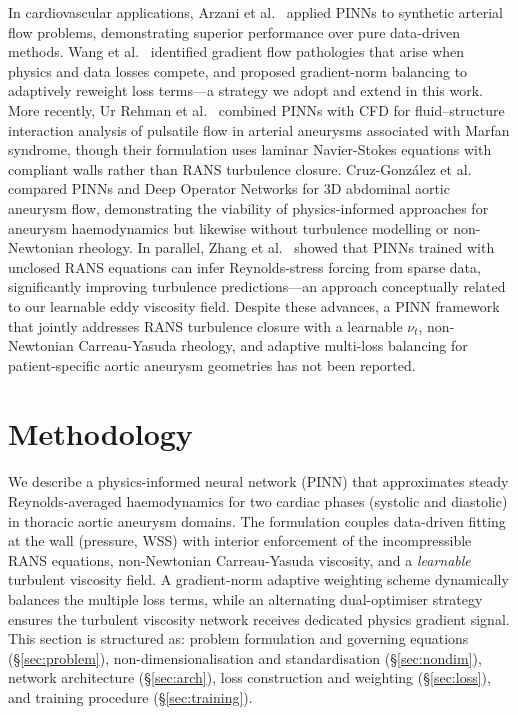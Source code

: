 \documentclass[11pt,a4paper]{article}
\begin{document}
In cardiovascular applications, Arzani et al.\ \cite{ref14} applied PINNs to synthetic arterial flow problems, demonstrating superior performance over pure data-driven methods. Wang et al.\ \cite{ref_wang2021} identified gradient flow pathologies that arise when physics and data losses compete, and proposed gradient-norm balancing to adaptively reweight loss terms---a strategy we adopt and extend in this work. More recently, Ur Rehman et al.\ \cite{ref_urrehman2025} combined PINNs with CFD for fluid--structure interaction analysis of pulsatile flow in arterial aneurysms associated with Marfan syndrome, though their formulation uses laminar Navier-Stokes equations with compliant walls rather than RANS turbulence closure. Cruz-Gonz{\'a}lez et al.\ \cite{ref_cruzgonzalez2025} compared PINNs and Deep Operator Networks for 3D abdominal aortic aneurysm flow, demonstrating the viability of physics-informed approaches for aneurysm haemodynamics but likewise without turbulence modelling or non-Newtonian rheology. In parallel, Zhang et al.\ \cite{ref_zhang2025} showed that PINNs trained with unclosed RANS equations can infer Reynolds-stress forcing from sparse data, significantly improving turbulence predictions---an approach conceptually related to our learnable eddy viscosity field. Despite these advances, a PINN framework that jointly addresses RANS turbulence closure with a learnable $\nu_t$, non-Newtonian Carreau-Yasuda rheology, and adaptive multi-loss balancing for patient-specific aortic aneurysm geometries has not been reported.

\section{Methodology}

We describe a physics-informed neural network (PINN) that approximates steady Reynolds-averaged haemodynamics for two cardiac phases (systolic and diastolic) in thoracic aortic aneurysm domains. The formulation couples data-driven fitting at the wall (pressure, WSS) with interior enforcement of the incompressible RANS equations, non-Newtonian Carreau-Yasuda viscosity, and a \emph{learnable} turbulent viscosity field. A gradient-norm adaptive weighting scheme dynamically balances the multiple loss terms, while an alternating dual-optimiser strategy ensures the turbulent viscosity network receives dedicated physics gradient signal. This section is structured as: problem formulation and governing equations (\S\ref{sec:problem}), non-dimensionalisation and standardisation (\S\ref{sec:nondim}), network architecture (\S\ref{sec:arch}), loss construction and weighting (\S\ref{sec:loss}), and training procedure (\S\ref{sec:training}).
\end{document}
